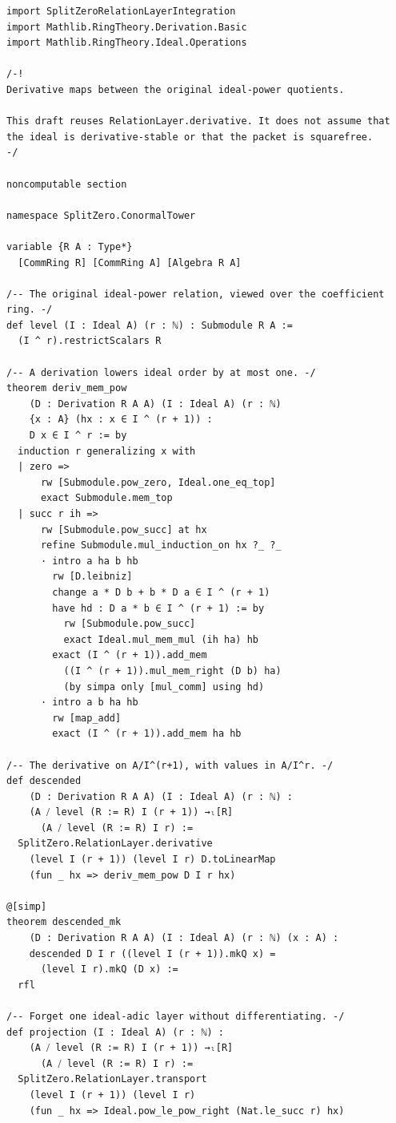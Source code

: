 \begin{verbatim}
import SplitZeroRelationLayerIntegration
import Mathlib.RingTheory.Derivation.Basic
import Mathlib.RingTheory.Ideal.Operations

/-!
Derivative maps between the original ideal-power quotients.

This draft reuses RelationLayer.derivative. It does not assume that
the ideal is derivative-stable or that the packet is squarefree.
-/

noncomputable section

namespace SplitZero.ConormalTower

variable {R A : Type*}
  [CommRing R] [CommRing A] [Algebra R A]

/-- The original ideal-power relation, viewed over the coefficient ring. -/
def level (I : Ideal A) (r : ℕ) : Submodule R A :=
  (I ^ r).restrictScalars R

/-- A derivation lowers ideal order by at most one. -/
theorem deriv_mem_pow
    (D : Derivation R A A) (I : Ideal A) (r : ℕ)
    {x : A} (hx : x ∈ I ^ (r + 1)) :
    D x ∈ I ^ r := by
  induction r generalizing x with
  | zero =>
      rw [Submodule.pow_zero, Ideal.one_eq_top]
      exact Submodule.mem_top
  | succ r ih =>
      rw [Submodule.pow_succ] at hx
      refine Submodule.mul_induction_on hx ?_ ?_
      · intro a ha b hb
        rw [D.leibniz]
        change a * D b + b * D a ∈ I ^ (r + 1)
        have hd : D a * b ∈ I ^ (r + 1) := by
          rw [Submodule.pow_succ]
          exact Ideal.mul_mem_mul (ih ha) hb
        exact (I ^ (r + 1)).add_mem
          ((I ^ (r + 1)).mul_mem_right (D b) ha)
          (by simpa only [mul_comm] using hd)
      · intro a b ha hb
        rw [map_add]
        exact (I ^ (r + 1)).add_mem ha hb

/-- The derivative on A/I^(r+1), with values in A/I^r. -/
def descended
    (D : Derivation R A A) (I : Ideal A) (r : ℕ) :
    (A ⧸ level (R := R) I (r + 1)) →ₗ[R]
      (A ⧸ level (R := R) I r) :=
  SplitZero.RelationLayer.derivative
    (level I (r + 1)) (level I r) D.toLinearMap
    (fun _ hx => deriv_mem_pow D I r hx)

@[simp]
theorem descended_mk
    (D : Derivation R A A) (I : Ideal A) (r : ℕ) (x : A) :
    descended D I r ((level I (r + 1)).mkQ x) =
      (level I r).mkQ (D x) :=
  rfl

/-- Forget one ideal-adic layer without differentiating. -/
def projection (I : Ideal A) (r : ℕ) :
    (A ⧸ level (R := R) I (r + 1)) →ₗ[R]
      (A ⧸ level (R := R) I r) :=
  SplitZero.RelationLayer.transport
    (level I (r + 1)) (level I r)
    (fun _ hx => Ideal.pow_le_pow_right (Nat.le_succ r) hx)


\end{verbatim}
